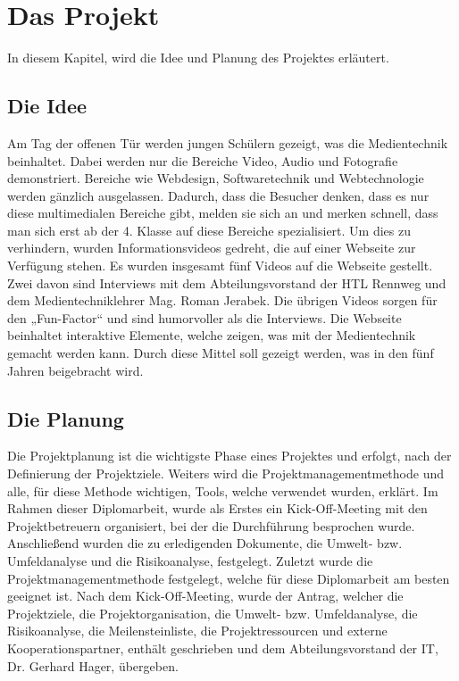\chapter{Das Projekt}

In diesem Kapitel, wird die Idee und Planung des Projektes erläutert. 

\section{Die Idee}
Am Tag der offenen Tür werden jungen Schülern gezeigt, was die Medientechnik beinhaltet. Dabei werden nur die Bereiche Video, Audio und Fotografie demonstriert. Bereiche wie Webdesign, Softwaretechnik und Webtechnologie werden gänzlich ausgelassen. Dadurch, dass die Besucher denken, dass es nur diese multimedialen Bereiche gibt, melden sie sich an und merken schnell, dass man sich erst ab der 4. Klasse auf diese Bereiche spezialisiert. Um dies zu verhindern, wurden Informationsvideos gedreht, die auf einer Webseite zur Verfügung stehen. Es wurden insgesamt fünf Videos auf die Webseite gestellt. Zwei davon sind Interviews mit dem Abteilungsvorstand der HTL Rennweg und dem Medientechniklehrer Mag. Roman Jerabek. Die übrigen Videos sorgen für den „Fun-Factor“ und sind humorvoller als die Interviews. Die Webseite beinhaltet interaktive Elemente, welche zeigen, was mit der Medientechnik gemacht werden kann. Durch diese Mittel soll gezeigt werden, was in den fünf Jahren beigebracht wird.

\section{Die Planung}
Die Projektplanung ist die wichtigste Phase eines Projektes und erfolgt, nach der Definierung der Projektziele.\cite{pmplanung} Weiters wird die Projektmanagementmethode und alle, für diese Methode wichtigen, Tools, welche verwendet wurden, erklärt. Im Rahmen dieser Diplomarbeit, wurde als Erstes ein Kick-Off-Meeting mit den Projektbetreuern organisiert, bei der die Durchführung besprochen wurde. Anschließend wurden die zu erledigenden Dokumente, die Umwelt- bzw. Umfeldanalyse und die Risikoanalyse, festgelegt. Zuletzt wurde die Projektmanagementmethode festgelegt, welche für diese Diplomarbeit am besten geeignet ist. Nach dem Kick-Off-Meeting, wurde der Antrag, welcher die Projektziele, die Projektorganisation, die Umwelt- bzw. Umfeldanalyse, die Risikoanalyse, die Meilensteinliste, die Projektressourcen und externe Kooperationspartner, enthält geschrieben und dem Abteilungsvorstand der IT, Dr. Gerhard Hager, übergeben.

